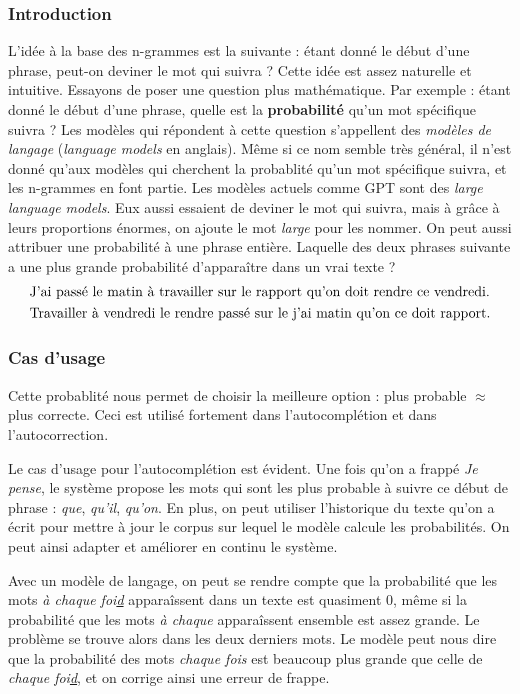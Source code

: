 \documentclass[11pt, a4paper]{report}
\begin{document}
  \subsubsection{Introduction}
  L'idée à la base des n-grammes est la suivante : étant donné le début d'une phrase, peut-on 
  deviner le mot qui suivra ? Cette idée est assez naturelle et intuitive. Essayons de poser 
  une question plus mathématique. Par exemple : étant donné le début d'une phrase, quelle est la \textbf{probabilité}
  qu'un mot spécifique suivra ? Les modèles qui répondent à cette question s'appellent des 
  \textit{modèles de langage} (\textit{language models} en anglais). Même si ce nom semble 
  très général, il n'est donné qu'aux modèles qui cherchent la probablité qu'un mot spécifique 
  suivra, et les n-grammes en font partie. Les modèles actuels comme GPT sont des \textit{large language models}. Eux aussi essaient 
  de deviner le mot qui suivra, mais à grâce à leurs proportions énormes, on ajoute le mot 
  \textit{large} pour les nommer. On peut aussi attribuer une probabilité à une phrase 
  entière. Laquelle des deux phrases suivante a une plus grande probabilité d'apparaître 
  dans un vrai texte ? 
  \begin{align*}
    &\textup{J'ai passé le matin à travailler sur le rapport qu'on doit rendre ce vendredi.} \\
    &\textup{Travailler à vendredi le rendre passé sur le j'ai matin qu'on ce doit rapport.}
  \end{align*}
  
  \subsubsection{Cas d'usage}
  Cette probablité nous permet de choisir la meilleure option : plus probable $\approx$ plus 
  correcte. Ceci est utilisé fortement dans l'autocomplétion et dans l'autocorrection. 

  Le cas d'usage pour l'autocomplétion est évident. Une fois qu'on a frappé \textit{Je pense}, 
  le système propose les mots qui sont les plus probable à suivre ce début de phrase : 
  \textit{que}, \textit{qu'il}, \textit{qu'on}. En plus, on peut utiliser l'historique du 
  texte qu'on a écrit pour mettre à jour le corpus sur lequel le modèle calcule les 
  probabilités. On peut ainsi adapter et améliorer en continu le système.  
  
  Avec un modèle 
  de langage, on peut se rendre compte que la probabilité que les mots \textit{à chaque foi\underline{d}}
  apparaîssent dans un texte est quasiment 0, même si la probabilité que les mots \textit{à chaque} 
  apparaîssent ensemble est assez grande. Le problème se trouve alors dans les deux derniers mots. 
  Le modèle peut nous dire que la probabilité des mots \textit{chaque fois} est beaucoup plus grande 
  que celle de \textit{chaque foi\underline{d}}, et on corrige ainsi une erreur de frappe. 
\end{document}
